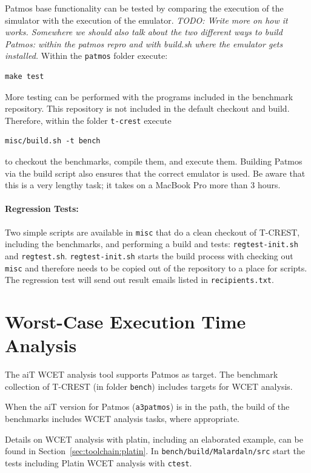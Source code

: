 \documentclass[a4paper,fontsize=10pt,twoside,DIV15,BCOR12mm,headinclude=true,footinclude=false,pagesize,bibtotoc]{scrbook}
\newcommand{\code}[1]{{\texttt{#1}}}
\newcommand{\todo}[1]{{\emph{TODO: #1}}}
\begin{document}
Patmos base functionality can be tested by comparing the execution of the simulator with
the execution of the emulator. \todo{Write more on how it works. Somewhere we should also
talk about the two different ways to build Patmos: within the patmos repro and with build.sh
where the emulator gets installed.}
Within the \code{patmos} folder execute:

\begin{verbatim}
make test
\end{verbatim}

More testing can be performed with the programs included in the benchmark repository.
This repository is not included in the default checkout and build. Therefore, within the
folder \code{t-crest} execute

\begin{verbatim}
misc/build.sh -t bench
\end{verbatim}

to checkout the benchmarks, compile them, and execute them. Building Patmos via the build script
also ensures that the correct emulator is used. Be aware that this is
a very lengthy task; it takes on a MacBook Pro more than 3 hours.

\paragraph{Regression Tests:} Two simple scripts are available in \code{misc} that do
a clean checkout of T-CREST, including the benchmarks, and performing a build
and tests: \code{regtest-init.sh} and \code{regtest.sh}. \code{regtest-init.sh} starts
the build process with checking out \code{misc} and therefore needs to
be copied out of the repository to a place for scripts. The regression test will
send out result emails listed in \code{recipients.txt}.

\section{Worst-Case Execution Time Analysis}

The aiT WCET analysis tool supports Patmos as target. The benchmark collection
of T-CREST (in folder \code{bench}) includes targets for WCET analysis.

When the aiT version for Patmos (\code{a3patmos}) is in the path, the build of
the benchmarks includes WCET analysis tasks, where appropriate.

Details on WCET analysis with platin, including an elaborated example,
can be found in Section~\ref{sec:toolchain:platin}.
In \code{bench/build/Malardaln/src} start the tests including Platin WCET analysis with \code{ctest}.
\end{document}
